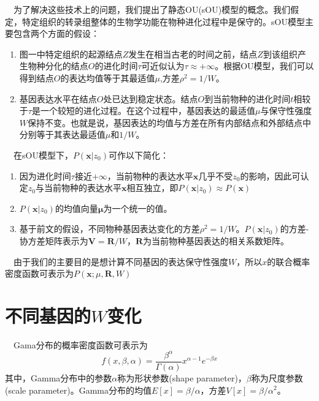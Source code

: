 \documentclass[hyperref,]{ctexart}
\providecommand{\tightlist}{%
  \setlength{\itemsep}{0pt}\setlength{\parskip}{0pt}}
\begin{document}
 为了解决这些技术上的问题，我们提出了静态OU(sOU)模型的概念。我们假定，特定组织的转录组整体的生物学功能在物种进化过程中是保守的。sOU模型主要包含两个方面的假设：

\begin{enumerate}
\def\labelenumi{\arabic{enumi}.}
\tightlist
\item
  图一中特定组织的起源结点\(Z\)发生在相当古老的时间之前，结点\(Z\)到该组织产生物种分化的结点\(O\)的进化时间\(\tau\)可近似认为\(\tau\approx+\infty\)。根据OU模型，我们可以得到结点\(O\)的表达均值等于其最适值\(\mu\),方差\(\rho^2=1/W\)。
\item
  基因表达水平在结点\(O\)处已达到稳定状态。结点\(O\)到当前物种的进化时间\(t\)相较于\(\tau\)是一个较短的进化过程。在这个过程中，基因表达的最适值\(\mu\)与保守性强度\(W\)保持不变。也就是说，基因表达的均值与方差在所有内部结点和外部结点中分别等于其表达最适值\(\mu\)和\(1/W\)。
\end{enumerate}

 在sOU模型下，\(P(\boldsymbol{x}|z_0)\)可作以下简化：

\begin{enumerate}
\def\labelenumi{\arabic{enumi}.}
\tightlist
\item
  因为进化时间\(\tau\)接近\(+\infty\)，当前物种的表达水平\(\boldsymbol{x}\)几乎不受\(z_0\)的影响，因此可认定\(z_0\)与当前物种的表达水平\(\boldsymbol{x}\)相互独立，即\(P(\boldsymbol{x}|z_0) \approx P(\boldsymbol{x})\)
\item
  \(P(\boldsymbol{x}|z_0)\)的均值向量\(\boldsymbol{\mu}\)为一个统一的值。
\item
  基于前文的假设，不同物种基因表达变化的方差\(\rho^2=1/W\)。\(P(\boldsymbol{x}|z_0)\)的方差-协方差矩阵表示为\(\boldsymbol{V}=\boldsymbol{R}/W\)，\(\boldsymbol{R}\)为当前物种基因表达的相关系数矩阵。
\end{enumerate}

 由于我们的主要目的是想计算不同基因的表达保守性强度\(W\)，所以\(x\)的联合概率密度函数可表示为\(P(\boldsymbol{x};\mu,\boldsymbol{R}, W)\)

\hypertarget{w}{%
\section{\texorpdfstring{不同基因的\(W\)变化}{不同基因的W变化}}\label{w}}

 Gama分布的概率密度函数可表示为
\[f\left(x,\beta,\alpha\right)=\frac{\beta^{\alpha}}{\Gamma\left(\alpha\right)}x^{\alpha-1}e^{-\beta x}\]
其中，Gamma分布中的参数\(\alpha\)称为形状参数(shape
parameter)，\(\beta\)称为尺度参数(scale
parameter)。Gamma分布的均值\(E[x]=\beta/\alpha\)，方差\(V[x]=\beta/\alpha^2\)。
\end{document}
